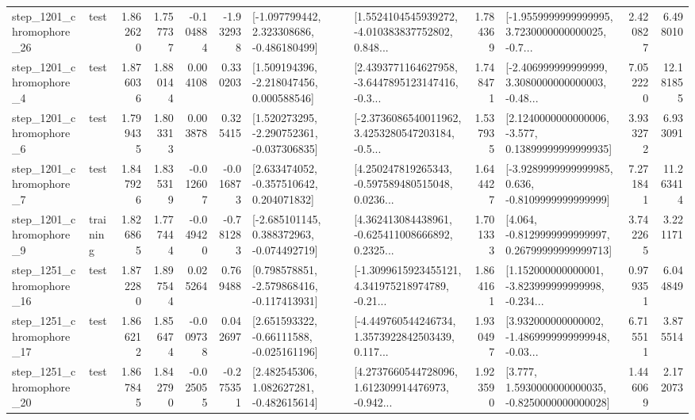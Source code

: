 \begin{tabular}{llrrrrllrlrr}
 step\_1201\_chromophore\_26 &      test &      1.862620 &    1.757737 &     -0.104884 & -1.932938 &   [-1.097799442, 2.323308686, -0.486180499] &  [1.5524104545939272, -4.010383837752802, 0.848... &       1.784369 &  [-1.9559999999999995, 3.7230000000000025, -0.7... &            2.420827 &          6.498010 \\
  step\_1201\_chromophore\_4 &      test &      1.876036 &    1.880144 &      0.004108 &  0.330203 &    [1.509194396, -2.218047456, 0.000588546] &  [2.4393771164627958, -3.6447895123147416, -0.3... &       1.748471 &  [-2.406999999999999, 3.3080000000000003, -0.48... &            7.052220 &         12.181855 \\
  step\_1201\_chromophore\_6 &      test &      1.799435 &    1.803313 &      0.003878 &  0.325415 &   [1.520273295, -2.290752361, -0.037306835] &  [-2.3736086540011962, 3.4253280547203184, -0.5... &       1.537935 &  [2.1240000000000006, -3.577, 0.13899999999999935] &            3.933272 &          6.933091 \\
  step\_1201\_chromophore\_7 &      test &      1.847926 &    1.835319 &     -0.012607 & -0.016873 &    [2.633474052, -0.357510642, 0.204071832] &  [4.250247819265343, -0.597589480515048, 0.0236... &       1.644427 &  [-3.9289999999999985, 0.636, -0.8109999999999999] &            7.271841 &         11.263414 \\
  step\_1201\_chromophore\_9 &  training &      1.826865 &    1.777444 &     -0.049420 & -0.781283 &   [-2.685101145, 0.388372963, -0.074492719] &  [4.362413084438961, -0.625411008666892, 0.2325... &       1.701333 &  [4.064, -0.8129999999999997, 0.26799999999999713] &            3.742265 &          3.221171 \\
 step\_1251\_chromophore\_16 &      test &      1.872280 &    1.897544 &      0.025264 &  0.769488 &   [0.798578851, -2.579868416, -0.117413931] &  [-1.3099615923455121, 4.341975218974789, -0.21... &       1.864161 &  [1.152000000000001, -3.823999999999998, -0.234... &            0.979351 &          6.044849 \\
 step\_1251\_chromophore\_17 &      test &      1.866212 &    1.856474 &     -0.009738 &  0.042697 &    [2.651593322, -0.66111588, -0.025161196] &  [-4.449760544246734, 1.3573922842503439, 0.117... &       1.930497 &  [3.932000000000002, -1.4869999999999948, -0.03... &            6.715511 &          3.875514 \\
 step\_1251\_chromophore\_20 &      test &      1.867845 &    1.842790 &     -0.025055 & -0.275351 &    [2.482545306, 1.082627281, -0.482615614] &  [4.2737660544728096, 1.612309914476973, -0.942... &       1.923590 &   [3.777, 1.5930000000000035, -0.8250000000000028] &            1.446069 &          2.172073 \\

\end{tabular}
